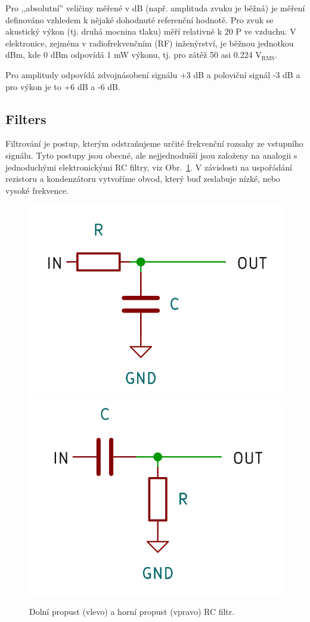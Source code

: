 Pro ,,absolutní'' veličiny měřené v dB (např. amplituda zvuku je běžná) je měření definováno vzhledem k nějaké dohodnuté referenční hodnotě. Pro zvuk se akustický výkon (tj. druhá mocnina tlaku) měří relativně k 20 \textmu P ve vzduchu. V elektronice, zejména v radiofrekvenčním (RF) inženýrství, je běžnou jednotkou dBm, kde 0 dBm odpovídá 1 mW výkonu, tj. pro zátěž 50 \textohm asi 0.224 V$_\mathrm{RMS}$.

Pro amplitudy odpovídá zdvojnásobení signálu +3 dB a poloviční signál -3 dB a pro výkon je to +6 dB a -6 dB.

\subsection{Filters}

Filtrování je postup, kterým odstraňujeme určité frekvenční rozsahy ze vstupního signálu. Tyto postupy jsou obecné, ale nejjednodušší jsou založeny na analogii s jednoduchými elektronickými RC filtry, viz Obr.~\ref{fig:RC-lowpass}. V závislosti na uspořádání rezistoru a kondenzátoru vytvoříme obvod, který buď zeslabuje nízké, nebo vysoké frekvence.
\begin{figure}
    \centering
    \includegraphics[width=0.49\linewidth]{low-pass-RC.png}%
    \includegraphics[width=0.49\linewidth]{high-pass-RC.png}%
    \label{fig:RC-lowpass}
    \caption{Dolní propust (vlevo) a horní propust (vpravo) RC filtr.}
\end{figure}

